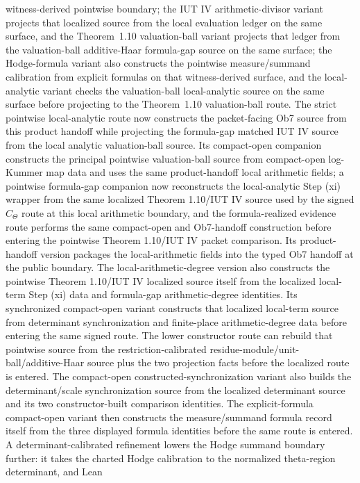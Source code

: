 \documentclass[11pt]{article}
\theoremstyle{plain}
\theoremstyle{definition}
\theoremstyle{remark}
\begin{document}
witness-derived pointwise boundary; the IUT IV arithmetic-divisor variant
projects that localized source from the local evaluation ledger on the same
surface, and the Theorem~1.10 valuation-ball variant projects that ledger from
the valuation-ball additive-Haar formula-gap source on the same surface; the
Hodge-formula variant also constructs the pointwise measure/summand
calibration from explicit formulas on that witness-derived surface, and the
local-analytic variant checks the valuation-ball local-analytic source on the
same surface before projecting to the Theorem~1.10 valuation-ball route.
The strict
pointwise local-analytic route now
constructs the packet-facing Ob7 source from this product handoff while
projecting the formula-gap matched IUT
IV source from the local analytic valuation-ball source.  Its compact-open
companion constructs the principal pointwise valuation-ball source from
compact-open log-Kummer map data and uses the same product-handoff local
arithmetic fields; a pointwise formula-gap companion now reconstructs the
local-analytic Step (xi) wrapper from the same localized Theorem 1.10/IUT IV
source used by the signed \(C_\Theta\) route at this local arithmetic
boundary, and the formula-realized evidence route performs the same
compact-open and Ob7-handoff construction before entering the pointwise
Theorem 1.10/IUT IV packet comparison.  Its product-handoff version packages
the local-arithmetic fields into the typed Ob7 handoff at the public boundary.
The local-arithmetic-degree version also constructs the pointwise Theorem
1.10/IUT IV localized source itself from the localized local-term Step (xi)
data and formula-gap arithmetic-degree identities.  Its synchronized compact-open
variant constructs that localized local-term source from determinant
synchronization and finite-place arithmetic-degree data before entering the
same signed route.  The lower constructor route can rebuild that pointwise
source from the restriction-calibrated residue-module/unit-ball/additive-Haar
source plus the two projection facts before the localized route is entered.
The compact-open constructed-synchronization variant also builds the
determinant/scale synchronization source from the localized determinant source
and its two constructor-built comparison identities.
The explicit-formula compact-open variant then constructs the
measure/summand formula record itself from the three displayed formula
identities before the same route is entered.  A determinant-calibrated
refinement lowers the Hodge summand boundary further: it takes the
charted Hodge calibration to the normalized theta-region determinant, and Lean
\end{document}
